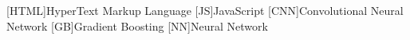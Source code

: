 [HTML]{HyperText Markup Language}
[JS]{JavaScript}
[CNN]{Convolutional Neural Network}
[GB]{Gradient Boosting}
[NN]{Neural Network}
